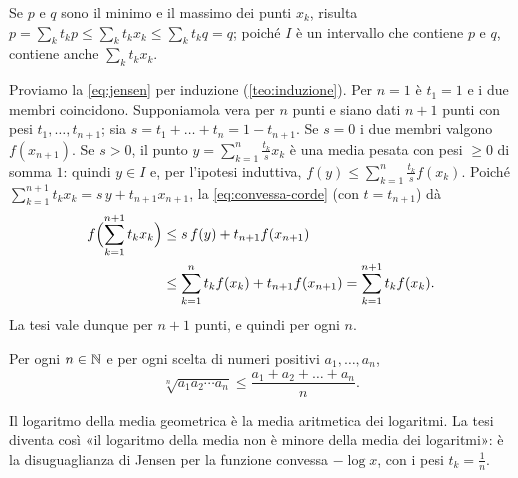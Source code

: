 \begin{dimostrazione}
Se $p$ e $q$ sono il minimo e il massimo dei punti $x_{k}$, risulta
$p=\sum_{k}t_{k}p\le\sum_{k}t_{k}x_{k}\le\sum_{k}t_{k}q=q$; poiché $I$ è un intervallo che
contiene $p$ e $q$, contiene anche $\sum_{k}t_{k}x_{k}$.

Proviamo la \eqref{eq:jensen} per induzione (\cref{teo:induzione}). Per $n=1$ è $t_{1}=1$
e i due membri coincidono. Supponiamola vera per $n$ punti e siano dati $n+1$ punti con
pesi $t_{1},\dots,t_{n+1}$; sia $s=t_{1}+\dots+t_{n}=1-t_{n+1}$. Se $s=0$ i due membri
valgono $f(x_{n+1})$. Se $s>0$, il punto $y=\sum_{k=1}^{n}\frac{t_{k}}{s}x_{k}$ è una media
pesata con pesi $\ge0$ di somma $1$: quindi $y\in I$ e, per l'ipotesi induttiva,
$f(y)\le\sum_{k=1}^{n}\frac{t_{k}}{s}f(x_{k})$. Poiché
$\sum_{k=1}^{n+1}t_{k}x_{k}=s\,y+t_{n+1}x_{n+1}$, la \eqref{eq:convessa-corde} (con
$t=t_{n+1}$) dà
\[
\begin{aligned}
  f\Bigl(\sum_{k=1}^{n+1}t_{k}x_{k}\Bigr)&\le s\,f(y)+t_{n+1}f(x_{n+1})\\
  &\le\sum_{k=1}^{n}t_{k}f(x_{k})+t_{n+1}f(x_{n+1})=\sum_{k=1}^{n+1}t_{k}f(x_{k}) .
\end{aligned}
\]
La tesi vale dunque per $n+1$ punti, e quindi per ogni $n$.
\end{dimostrazione}

\begin{corollario}
\label{cor:media-aritmetica-geometrica}
Per ogni $n\in\mathbb{N}$ e per ogni scelta di numeri positivi $a_{1},\dots,a_{n}$,
\begin{equation}\label{eq:am-gm}
  \sqrt[n]{a_{1}a_{2}\cdots a_{n}}\le\frac{a_{1}+a_{2}+\dots+a_{n}}{n} .
\end{equation}
\end{corollario}

\begin{schema}
\end{schema}

\begin{strategia}
Il logaritmo della media geometrica è la media aritmetica dei logaritmi. La tesi diventa
così «il logaritmo della media non è minore della media dei logaritmi»: è la
disuguaglianza di Jensen per la funzione convessa $-\log x$, con i pesi $t_{k}=\frac1n$.
\end{strategia}

